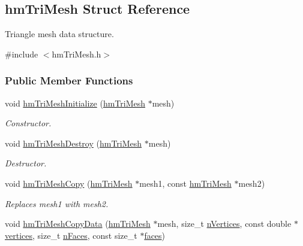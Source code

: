 \hypertarget{structhm_tri_mesh}{\subsection{hm\-Tri\-Mesh Struct Reference}
\label{structhm_tri_mesh}
}


Triangle mesh data structure.  




{\ttfamily \#include $<$hm\-Tri\-Mesh.\-h$>$}

\subsubsection*{Public Member Functions}
\begin{DoxyCompactItemize}
\item 
void \hyperlink{structhm_tri_mesh_aa648381694a0814d6316de6a7bd450fe}{hm\-Tri\-Mesh\-Initialize} (\hyperlink{structhm_tri_mesh}{hm\-Tri\-Mesh} $\ast$mesh)
\begin{DoxyCompactList}\small\item\em Constructor. \end{DoxyCompactList}\item 
void \hyperlink{structhm_tri_mesh_a611fcd313be57d8169355f0c94184ea7}{hm\-Tri\-Mesh\-Destroy} (\hyperlink{structhm_tri_mesh}{hm\-Tri\-Mesh} $\ast$mesh)
\begin{DoxyCompactList}\small\item\em Destructor. \end{DoxyCompactList}\item 
void \hyperlink{structhm_tri_mesh_a190234d61c5571c1a05465e96353d496}{hm\-Tri\-Mesh\-Copy} (\hyperlink{structhm_tri_mesh}{hm\-Tri\-Mesh} $\ast$mesh1, const \hyperlink{structhm_tri_mesh}{hm\-Tri\-Mesh} $\ast$mesh2)
\begin{DoxyCompactList}\small\item\em Replaces mesh1 with mesh2. \end{DoxyCompactList}\item 
void \hyperlink{structhm_tri_mesh_a0b4da8535f470323fee6e98ee159df6e}{hm\-Tri\-Mesh\-Copy\-Data} (\hyperlink{structhm_tri_mesh}{hm\-Tri\-Mesh} $\ast$mesh, size\-\_\-t \hyperlink{structhm_tri_mesh_aad9ed5da071bc7451fa5f5aeac7c1814}{n\-Vertices}, const double $\ast$\hyperlink{structhm_tri_mesh_a7374e0ae5c0af9c7c42f1293643c691e}{vertices}, size\-\_\-t \hyperlink{structhm_tri_mesh_a38de205b6938c9e0db72ac866a803be3}{n\-Faces}, const size\-\_\-t $\ast$\hyperlink{structhm_tri_mesh_ac0ddc0ca3b34698286793c9336af359d}{faces})

\end{DoxyCompactItemize}

